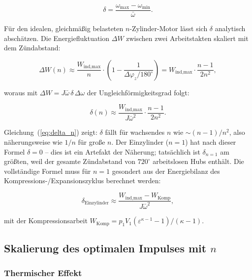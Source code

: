 ﻿\documentclass[a4paper,12pt]{article}
\begin{document}
\begin{equation}
  \delta = \frac{\omega_\text{max} - \omega_\text{min}}{\bar{\omega}}.
  \label{eq:delta}
\end{equation}

Für den idealen, gleichmäßig belasteten $n$-Zylinder-Motor lässt sich
$\delta$ analytisch abschätzen. Die Energiefluktuation $\Delta W$ zwischen
zwei Arbeitstakten skaliert mit dem Zündabstand:

\begin{equation}
  \Delta W(n) \approx \frac{W_\text{ind,max}}{n} \cdot
    \left(1 - \frac{1}{\Delta\varphi_z/180^\circ}\right)
  = W_\text{ind,max} \cdot \frac{n-1}{2n^2},
  \label{eq:DeltaW}
\end{equation}

woraus mit $\Delta W = J\bar{\omega}\,\delta\,\Delta\omega$ der
Ungleichförmigkeitsgrad folgt:

\begin{equation}
  \boxed{
  \delta(n) \approx \frac{W_\text{ind,max}}{J \bar{\omega}^2} \cdot
    \frac{n-1}{2n^2}.
  }
  \label{eq:delta_n}
\end{equation}

Gleichung~(\ref{eq:delta_n}) zeigt: $\delta$ fällt für wachsendes $n$
wie $\sim (n-1)/n^2$, also näherungsweise wie $1/n$ für große $n$.
Der Einzylinder ($n=1$) hat nach dieser Formel $\delta = 0$ -- dies
ist ein Artefakt der Näherung; tatsächlich ist $\delta_{n=1}$ am größten,
weil der gesamte Zündabstand von $720^\circ$ arbeitslosen Hubs enthält.
Die vollständige Formel muss für $n=1$ gesondert aus der
Energiebilanz des Kompressions-/Expansionszyklus berechnet werden:

\begin{equation}
  \delta_\text{Einzylinder} \approx
    \frac{W_\text{ind,max} - W_\text{Komp}}{J \bar{\omega}^2},
  \label{eq:delta_1}
\end{equation}

\noindent
mit der Kompressionsarbeit $W_\text{Komp} = p_1 V_1 (\varepsilon^{\kappa-1}-1)/(\kappa-1)$.

\subsection{Skalierung des optimalen Impulses mit $n$}

\subsubsection*{Thermischer Effekt}
\end{document}
